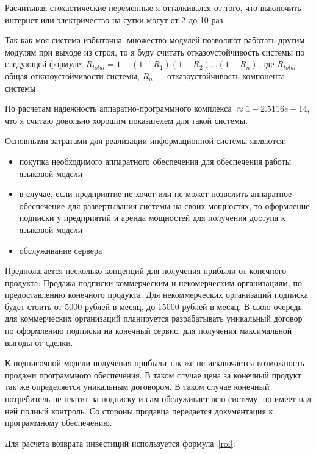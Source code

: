 Расчитывая стохастические переменные я отталкивался от того, что выключить
интернет или электричество на сутки могут от 2 до 10 раз

Так как моя система избыточна: множество модулей позволяют работать другим
модулям при выходе из строя, то я буду считать отказоустойчивость системы по
следующей формуле: $R_{total} = 1 - (1 - R_1)(1 - R_2)\ldots(1 - R_n)$, где 
$R_{total}$ --- общая отказоустойчивости системы, $R_n$ --- отказоустойчивость
компонента системы. 

По расчетам надежность аппаратно-программного комплекса
$\approx 1 - 2.5116e-14$, что я считаю довольно хорошим показателем для
такой системы.


Основными затратами для реализации информационной системы являются:

\begin{itemize}
\item покупка необходимого аппаратного обеспечения для обеспечения работы
    языковой модели
\item в случае, если предприятие не хочет или не может позволить аппаратное 
    обеспечение для развертывания системы на своих мощностях, то оформление 
    подписки у предприятий и аренда мощностей для получения доступа к языковой 
    модели
\item обслуживание сервера
\end{itemize}

Предполагается несколько концепций для получения прибыли от конечного продукта:
Продажа подписки коммерческим и некомерческим организациям, по предоставлению 
конечного продукта. Для некоммерческих организаций подписка будет стоить от 
5000 рублей в месяц, до 15000 рублей в месяц. В свою очередь для коммерческих
организаций планируется разрабатывать уникальный договор по оформлению подписки
на конечный сервис, для получения максимальной выгоды от сделки.

К подписочной модели получения прибыли так же не исключается возможность продажи
программного обеспечения. В таком случае цена за конечный продукт так же 
определяется уникальным договором. В таком случае конечный потребитель не 
платит за подписку и сам обслуживает всю систему, но имеет над ней полный 
контроль. Со стороны продавца передается документация к программному обеспечению.

Для расчета возврата инвестиций используется формула~\ref{roi}:

